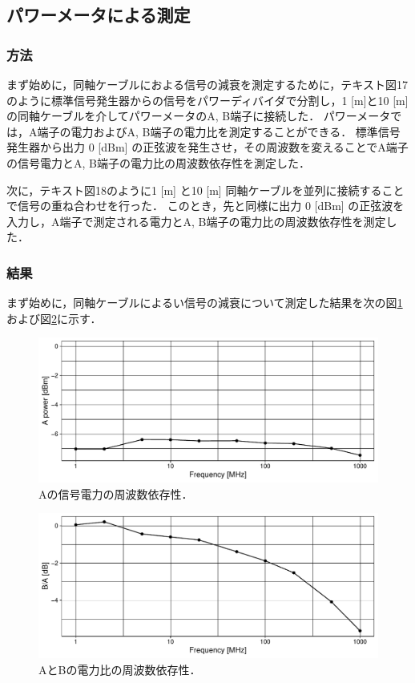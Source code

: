 \documentclass[uplatex,dvipdfmx,a4j,12pt]{jsarticle}
\begin{document}
\subsection{パワーメータによる測定}
\subsubsection{方法}
まず始めに，同軸ケーブルにおよる信号の減衰を測定するために，テキスト図17のように標準信号発生器からの信号をパワーディバイダで分割し，1 [m]と10 [m]の同軸ケーブルを介してパワーメータのA, B端子に接続した．
パワーメータでは，A端子の電力およびA, B端子の電力比を測定することができる．
標準信号発生器から出力 0 [dBm] の正弦波を発生させ，その周波数を変えることでA端子の信号電力とA, B端子の電力比の周波数依存性を測定した．

次に，テキスト図18のように1 [m] と10 [m] 同軸ケーブルを並列に接続することで信号の重ね合わせを行った．
このとき，先と同様に出力 0 [dBm] の正弦波を入力し，A端子で測定される電力とA, B端子の電力比の周波数依存性を測定した．

\subsubsection{結果}
まず始めに，同軸ケーブルによるい信号の減衰について測定した結果を次の図\ref{fig:1_1}および図\ref{fig:1_2}に示す．
\begin{figure}[H]
    \centering
    \includegraphics[width=0.9\linewidth]{data/1_1/power_vs_freq.pdf}
    \caption{Aの信号電力の周波数依存性．}
    \label{fig:1_1}
\end{figure}  

\begin{figure}[H]
  \centering
  \includegraphics[width=\linewidth]{data/1_1/power_ratio_vs_freq.pdf}
  \caption{AとBの電力比の周波数依存性．}
  \label{fig:1_2}        
\end{figure}
\end{document}
